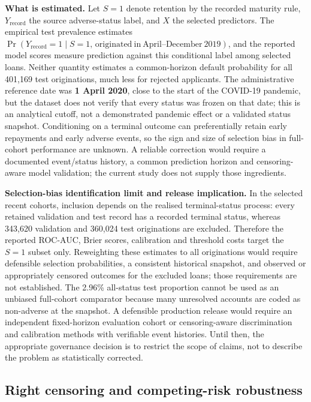 \documentclass[10pt]{article}
\begin{document}
\noindent\textbf{What is estimated.} Let $S=1$ denote retention by the recorded maturity rule, $Y_{\mathrm{record}}$ the source adverse-status label, and $X$ the selected predictors. The empirical test prevalence estimates $\Pr(Y_{\mathrm{record}}=1\mid S=1,\,\mathrm{originated\ in\ April\mbox{--}December\ 2019})$, and the reported model scores measure prediction against this conditional label among selected loans. Neither quantity estimates a common-horizon default probability for all 401,169 test originations, much less for rejected applicants. The administrative reference date was \textbf{1 April 2020}, close to the start of the COVID-19 pandemic, but the dataset does not verify that every status was frozen on that date; this is an analytical cutoff, not a demonstrated pandemic effect or a validated status snapshot. Conditioning on a terminal outcome can preferentially retain early repayments and early adverse events, so the sign and size of selection bias in full-cohort performance are unknown. A reliable correction would require a documented event/status history, a common prediction horizon and censoring-aware model validation; the current study does not supply those ingredients.

\noindent\textbf{Selection-bias identification limit and release implication.} In the selected recent cohorts, inclusion depends on the realised terminal-status process: every retained validation and test record has a recorded terminal status, whereas 343,620 validation and 360,024 test originations are excluded. Therefore the reported ROC-AUC, Brier scores, calibration and threshold costs target the \(S=1\) subset only. Reweighting these estimates to all originations would require defensible selection probabilities, a consistent historical snapshot, and observed or appropriately censored outcomes for the excluded loans; those requirements are not established. The 2.96\% all-status test proportion cannot be used as an unbiased full-cohort comparator because many unresolved accounts are coded as non-adverse at the snapshot. A defensible production release would require an independent fixed-horizon evaluation cohort or censoring-aware discrimination and calibration methods with verifiable event histories. Until then, the appropriate governance decision is to restrict the scope of claims, not to describe the problem as statistically corrected.

\subsection{Right censoring and competing-risk robustness}
\label{sec:competingrisk}
\end{document}
